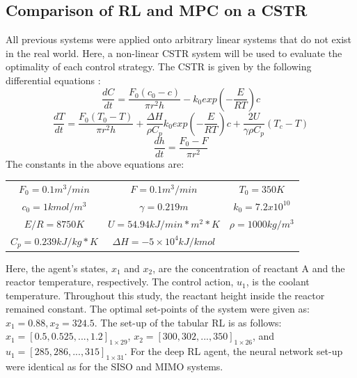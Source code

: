 \subsection{Comparison of RL and MPC on a CSTR}
All previous systems were applied onto arbitrary linear systems that do not exist in the real world. Here, a non-linear CSTR system will be used to evaluate the optimality of each control strategy. The CSTR is given by the following differential equations \cite{chem_eng}:
\begin{equation}
\dfrac{dC}{dt} = \dfrac{F_0(c_0 - c)}{\pi r^2 h} - k_0exp(-\dfrac{E}{RT})c
\end{equation}
\begin{equation}
\dfrac{dT}{dt} = \dfrac{F_0(T_0 - T)}{\pi r^2 h} + \dfrac{\Delta H}{\rho C_p} k_0 exp(-\dfrac{E}{RT})c + \dfrac{2U}{\gamma \rho C_p}(T_c - T)
\end{equation}
\begin{equation}
\dfrac{dh}{dt} = \dfrac{F_0 - F}{\pi r^2 }
\end{equation}
The constants in the above equations are: \\
\begin{table}[H]
\centering
\begin{tabular}{ccc}
$ F_0 = 0.1 m^3 / min$ & $ F = 0.1 m^3 / min $ & $ T_0 = 350 K $ \\ 
$c_0 = 1 kmol/m^3 $ & $\gamma = 0.219 m $	  & $k_0 = 7.2 x 10^{10} $ \\
$ E/R = 8750 K $ & $ U = 54.94 kJ/min*m^2*K $ & $ \rho = 1000 kg/m^3 $ \\
$C_p = 0.239 kJ/kg * K$ & $\Delta H = -5 \times 10^4 kJ/kmol$
\end{tabular}
\end{table}
Here, the agent's states, $x_1$ and $x_2$, are the concentration of reactant A and the reactor temperature, respectively.  The control action, $u_1$, is the coolant temperature. Throughout this study, the reactant height inside the reactor remained constant. The optimal set-points of the system were given as: $x_1 = 0.88, x_2 = 324.5$. The set-up of the tabular RL is as follows: $x_1 = [0.5, 0.525, ..., 1.2]_{1 \times 29}$, $x_2 = [300, 302, ..., 350]_{1 \times 26}$, and $u_1 = [285, 286, ..., 315]_{1 \times 31}$.  For the deep RL agent, the neural network set-up were identical as for the SISO and MIMO systems.

